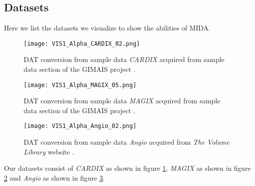 \subsection{Datasets}

Here we list the datasets we visualize to show the abilities of MIDA. 

\begin{figure}[h]
	\centering
	\texttt{[image: VIS1\_Alpha\_CARDIX\_02.png]} \\
	\caption{DAT conversion from sample data \emph{CARDIX} \cite{gimias_sampledata_2018} acquired from sample data section of the GIMAIS project \cite{gimias_2018}.}
	\label{fig:Vis1_Alpha_CARDIX_02}
\end{figure}

\begin{figure}[h]
	\centering
	\texttt{[image: VIS1\_Alpha\_MAGIX\_05.png]} \\
	\caption{DAT conversion from sample data \emph{MAGIX} \cite{gimias_sampledata_2018} acquired from sample data section of the GIMAIS project \cite{gimias_2018}.}
	\label{fig:Vis1_Alpha_MAGIX_05}
\end{figure}


\begin{figure}[h]
	\centering
	\texttt{[image: VIS1\_Alpha\_Angio\_02.png]} \\
	\caption{DAT conversion from sample data \emph{Angio} \cite{roettger_VOL_2018} acquired from \emph{The Volume Library} website \cite{roettger_VOL_2018}.}
	\label{fig:Vis1_Alpha_Angio_02}
\end{figure}

Our datasets consist of \emph{CARDIX} as shown in figure \ref{fig:Vis1_Alpha_CARDIX_02}, \emph{MAGIX} as shown in figure \ref{fig:Vis1_Alpha_MAGIX_05} and \emph{Angio} as shown in figure \ref{fig:Vis1_Alpha_Angio_02}.

